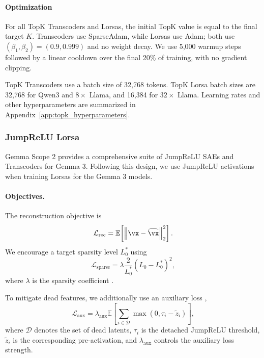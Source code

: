 \documentclass{article}
\begin{document}
\paragraph{Optimization}
For all TopK Transcoders and Lorsas, the initial TopK value is equal to the
final target $K$. Transcoders use SparseAdam, while Lorsas use Adam;
both use $(\beta_1,\beta_2)=(0.9,0.999)$ and no weight decay. We use 5,000 warmup
steps followed by a linear cooldown over the final 20\% of training, with no
gradient clipping.

TopK Transcoders use a batch size of 32,768 tokens. TopK Lorsa batch sizes are
32,768 for Qwen3 and $8\times$ Llama, and 16,384 for $32\times$ Llama. Learning
rates and other hyperparameters are summarized in
Appendix~\ref{app:topk_hyperparameters}.


\subsubsection{JumpReLU Lorsa}
\label{sec:jumprelu_lorsa}

Gemma Scope 2 provides a comprehensive suite of JumpReLU SAEs and Transcoders
for Gemma 3. Following this design, we use JumpReLU activations when training
Lorsas for the Gemma 3 models.

\paragraph{Objectives.}
The reconstruction objective is
\begin{equation}
    \mathcal{L}_{\mathrm{rec}}
    =
    \mathbb{E}\!\left[
        \left\|
        \vx-\widehat{\vx}
        \right\|_2^2
    \right].
\end{equation}
We encourage a target sparsity level $L_0^{*}$ using
\begin{equation}
    \mathcal{L}_{\mathrm{sparse}}
    =
    \lambda
    \frac{2}{L_0^{*}}
    \left(
        L_0-L_0^{*}
    \right)^2 ,
\end{equation}
where $\lambda$ is the sparsity coefficient
\citep{mcdougall2025gemmascope2}.

To mitigate dead features, we additionally use an auxiliary loss
\citep{rajamanoharan2024jumprelu},
\begin{equation}
    \mathcal{L}_{\mathrm{aux}}
    =
    \lambda_{\mathrm{aux}}
    \mathbb{E}\!\left[
        \sum_{i \in \mathcal{D}}
        \max\!\left(0, \tau_i - \tilde{z}_i\right)
    \right],
\end{equation}
where $\mathcal{D}$ denotes the set of dead latents, $\tau_i$ is the detached
JumpReLU threshold, $\tilde{z}_i$ is the corresponding pre-activation, and
$\lambda_{\mathrm{aux}}$ controls the auxiliary loss strength.
\end{document}
